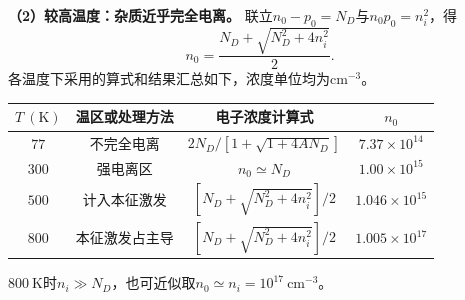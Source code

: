 \begin{problem}
    \textbf{（2）较高温度：杂质近乎完全电离。}
    联立$n_0-p_0=N_D$与$n_0p_0=n_i^2$，得
    \[
    n_0=\frac{N_D+\sqrt{N_D^2+4n_i^2}}{2}.
    \]
    各温度下采用的算式和结果汇总如下，浓度单位均为$\mathrm{cm}^{-3}$。
    \begin{center}
        \small
        \begin{tabular}{c c c c}
            \hline
            $T\ (\mathrm{K})$ & 温区或处理方法 & 电子浓度计算式 & $n_0$ \\
            \hline
            $77$ & 不完全电离 & $2N_D/[1+\sqrt{1+4AN_D}]$ & $\boxed{7.37\times10^{14}}$ \\
            $300$ & 强电离区 & $n_0\simeq N_D$ & $\boxed{1.00\times10^{15}}$ \\
            $500$ & 计入本征激发 & $[N_D+\sqrt{N_D^2+4n_i^2}]/2$ & $\boxed{1.046\times10^{15}}$ \\
            $800$ & 本征激发占主导 & $[N_D+\sqrt{N_D^2+4n_i^2}]/2$ & $\boxed{1.005\times10^{17}}$ \\
            \hline
        \end{tabular}
    \end{center}
    $800\ \mathrm{K}$时$n_i\gg N_D$，也可近似取$n_0\simeq n_i=10^{17}\ \mathrm{cm}^{-3}$。
\end{problem}

